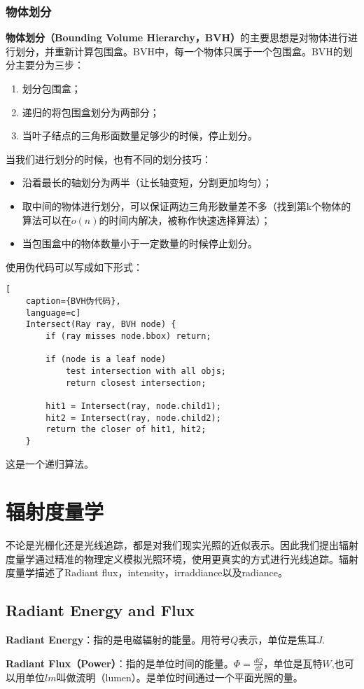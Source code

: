\documentclass[openany]{progbookcn}
\begin{document}
\subsection{物体划分}
\textbf{物体划分（Bounding Volume Hierarchy，BVH）}的主要思想是对物体进行进行划分，并重新计算包围盒。BVH中，每一个物体只属于一个包围盒。BVH的划分主要分为三步：
\begin{enumerate}
	\item 划分包围盒；
	\item 递归的将包围盒划分为两部分；
	\item 当叶子结点的三角形面数量足够少的时候，停止划分。
\end{enumerate}
当我们进行划分的时候，也有不同的划分技巧：
\begin{itemize}
	\item 沿着最长的轴划分为两半（让长轴变短，分割更加均匀）；
	\item 取中间的物体进行划分，可以保证两边三角形数量差不多（找到第k个物体的算法可以在$o(n)$的时间内解决，被称作快速选择算法）；
	\item 当包围盒中的物体数量小于一定数量的时候停止划分。
\end{itemize}
使用伪代码可以写成如下形式：
\begin{lstlisting}[
	caption={BVH伪代码},
	language=c]
	Intersect(Ray ray, BVH node) {
		if (ray misses node.bbox) return;
		
		if (node is a leaf node)
			test intersection with all objs;
			return closest intersection;
		
		hit1 = Intersect(ray, node.child1);
		hit2 = Intersect(ray, node.child2);
		return the closer of hit1, hit2;
	}
\end{lstlisting}
这是一个递归算法。

\chapter{辐射度量学}
不论是光栅化还是光线追踪，都是对我们现实光照的近似表示。因此我们提出辐射度量学通过精准的物理定义模拟光照环境，使用更真实的方式进行光线追踪。辐射度量学描述了Radiant flux，intensity，irraddiance以及radiance。

\section{Radiant Energy and Flux}
\textbf{Radiant Energy}：指的是电磁辐射的能量。用符号$Q$表示，单位是焦耳$J$.

\textbf{Radiant Flux（Power）}：指的是单位时间的能量。$\Phi=\frac{dQ}{dt}$，单位是瓦特$W$,也可以用单位$lm$叫做流明（lumen）。是单位时间通过一个平面光照的量。
\end{document}
